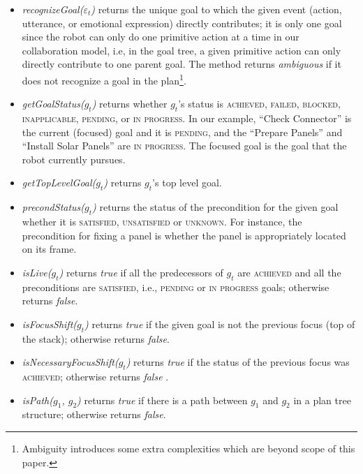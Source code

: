 \documentclass[12pt]{report}
\begin{document}
\begin{itemize}
  \setlength\itemsep{1mm}
  \item \textit{recognizeGoal($\varepsilon_t$)} returns the unique goal to which
  the given event (action, utterance, or emotional expression) directly
  contributes; it is only one goal since the robot can only do one primitive
  action at a time in our collaboration model, i.e, in the goal tree, a given
  primitive action can only directly contribute to one parent goal. The method
  returns \textit{ambiguous} if it does not recognize a goal in the
  plan\footnote{Ambiguity introduces some extra complexities which are beyond
  scope of this paper.}.
  
  \item \textit{getGoalStatus($g_t$)} returns whether $g_t$'s status is
  \textsc{achieved, failed, blocked, inapplicable, pending,} or \textsc{in
  progress}. In our example, ``Check Connector'' is the current (focused) goal
  and it is \textsc{pending}, and the ``Prepare Panels'' and ``Install Solar
  Panels'' are \textsc{in progress}. The focused goal is the goal that the robot
  currently pursues.
  
  \item \textit{getTopLevelGoal($g_t$)} returns $g_t$'s top level goal.

  \item \textit{precondStatus($g_t$)} returns the status of the precondition for
  the given goal whether it is \textsc{satisfied, unsatisfied} or
  \textsc{unknown}. For instance, the precondition for fixing a panel is whether
  the panel is appropriately located on its frame.
  
  \item \textit{isLive($g_t$)} returns \textit{true} if all the predecessors of
  $g_t$ are \textsc{achieved} and all the preconditions are \textsc{satisfied},
  i.e., \textsc{pending} or \textsc{in progress} goals; otherwise returns
  \textit{false}.
  
  \item \textit{isFocusShift($g_t$)} returns \textit{true} if the given
  goal is not the previous focus (top of the stack); otherwise returns
  \textit{false}.
  
  \item \textit{isNecessaryFocusShift($g_t$)} returns \textit{true} if the
  status of the previous focus was \textsc{achieved}; otherwise returns
  \textit{false} \cite{rich:focused-unfocused-users}.
  
  \item \textit{isPath($g_1$, $g_2$)} returns \textit{true} if there is a path
  between $g_1$ and $g_2$ in a plan tree structure; otherwise returns
  \textit{false}.
  

\end{itemize}
\end{document}
